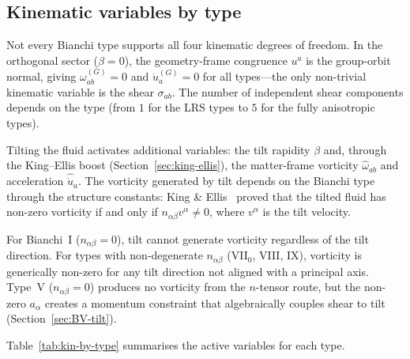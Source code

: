 \subsection{Kinematic variables by type}\label{sec:kin-by-type}

Not every Bianchi type supports all four kinematic degrees of
freedom.  In the orthogonal sector ($\beta = 0$), the
geometry-frame congruence $u^a$ is the group-orbit normal,
giving $\omega_{ab}^{(G)} = 0$ and $\dot{u}_a^{(G)} = 0$
for all types---the only non-trivial kinematic variable is the
shear $\sigma_{ab}$.  The number of independent shear components
depends on the type (from $1$ for the LRS types to $5$ for the
fully anisotropic types).

Tilting the fluid activates additional variables: the tilt
rapidity $\beta$ and, through the King--Ellis boost
(Section~\ref{sec:king-ellis}), the matter-frame
vorticity $\hat{\omega}_{ab}$ and acceleration
$\hat{\dot{u}}_a$.  The vorticity generated by tilt depends on
the Bianchi type through the structure constants: King \&
Ellis~\cite{KingEllis1973} proved that the tilted fluid has
non-zero vorticity if and only if $n_{\alpha\beta}v^\alpha
\neq 0$, where $v^\alpha$ is the tilt velocity.

For Bianchi~I ($n_{\alpha\beta} = 0$), tilt cannot generate
vorticity regardless of the tilt direction.  For types with
non-degenerate $n_{\alpha\beta}$ (VII$_0$, VIII, IX), vorticity
is generically non-zero for any tilt direction not aligned with
a principal axis.  Type~V ($n_{\alpha\beta} = 0$) produces no
vorticity from the $n$-tensor route, but the non-zero
$a_\alpha$ creates a momentum constraint that algebraically
couples shear to tilt
(Section~\ref{sec:BV-tilt}).

Table~\ref{tab:kin-by-type} summarises the active variables
for each type.


